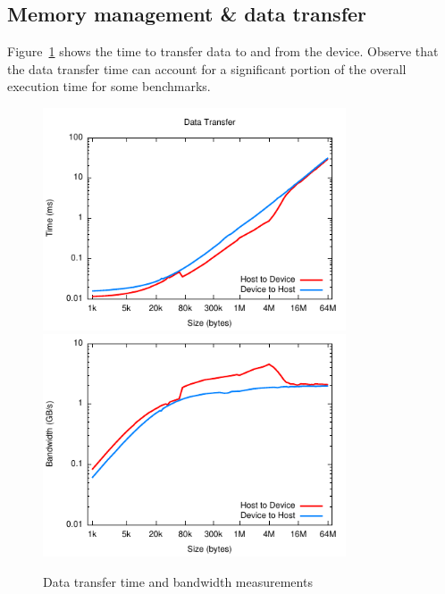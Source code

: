 \subsection{Memory management \& data transfer}

Figure~\ref{fig:data_transfer} shows the time to transfer data to and from the
device. Observe that the data transfer time can account for a significant
portion of the overall execution time for some benchmarks.


\begin{figure}
    \centering
    \includegraphics[width=0.8\textwidth]{images/results/bandwidth/time} \\
    \includegraphics[width=0.8\textwidth]{images/results/bandwidth/bandwidth}
    \caption{Data transfer time and bandwidth measurements}
    \label{fig:data_transfer}
\end{figure}

